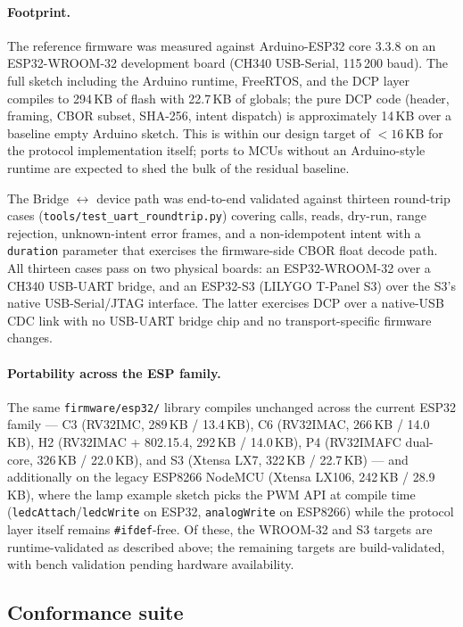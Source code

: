\documentclass[11pt,a4paper]{article}
\begin{document}
\paragraph{Footprint.} The reference firmware was measured against
Arduino-ESP32 core 3.3.8 on an ESP32-WROOM-32 development board (CH340
USB-Serial, 115\,200 baud). The full sketch including the Arduino runtime,
FreeRTOS, and the DCP layer compiles to 294\,KB of flash with 22.7\,KB of
globals; the pure DCP code (header, framing, CBOR subset, SHA-256, intent
dispatch) is approximately 14\,KB over a baseline empty Arduino sketch.
This is within our design target of $<\!16$\,KB for the protocol
implementation itself; ports to MCUs without an Arduino-style runtime are
expected to shed the bulk of the residual baseline.

The Bridge $\leftrightarrow$ device path was end-to-end validated against
thirteen round-trip cases (\texttt{tools/test\_uart\_roundtrip.py}) covering
calls, reads, dry-run, range rejection, unknown-intent error frames, and a
non-idempotent intent with a \texttt{duration} parameter that exercises
the firmware-side CBOR float decode path. All thirteen cases pass on two
physical boards: an ESP32-WROOM-32 over a CH340 USB-UART bridge, and an
ESP32-S3 (LILYGO T-Panel S3) over the S3's native USB-Serial/JTAG
interface. The latter exercises DCP over a native-USB CDC link with no
USB-UART bridge chip and no transport-specific firmware changes.

\paragraph{Portability across the ESP family.} The same
\texttt{firmware/esp32/} library compiles unchanged across the
current ESP32 family --- C3 (RV32IMC, 289\,KB / 13.4\,KB), C6
(RV32IMAC, 266\,KB / 14.0\,KB), H2 (RV32IMAC + 802.15.4, 292\,KB /
14.0\,KB), P4 (RV32IMAFC dual-core, 326\,KB / 22.0\,KB), and S3
(Xtensa LX7, 322\,KB / 22.7\,KB) --- and additionally on the legacy
ESP8266 NodeMCU (Xtensa LX106, 242\,KB / 28.9\,KB), where the lamp
example sketch picks the PWM API at compile time
(\texttt{ledcAttach}/\texttt{ledcWrite} on ESP32, \texttt{analogWrite}
on ESP8266) while the protocol layer itself remains
\texttt{\#ifdef}-free. Of these, the WROOM-32 and S3 targets are
runtime-validated as described above; the remaining targets are
build-validated, with bench validation pending hardware availability.

\subsection{Conformance suite}
\end{document}
